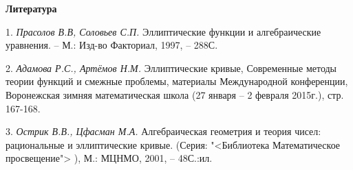 \smallskip \centerline{\bf Литература}\nopagebreak

1. {\it Прасолов В.В, Соловьев С.П. } Эллиптические функции и алгебраические уравнения. -- М.: Изд-во Факториал, 1997, -- 288С.

2. {\it Адамова Р.С., Артёмов Н.М. }Эллиптические кривые, Современные методы теории функций и смежные проблемы, материалы Международной конференции, Воронежская зимняя математическая школа (27 января -- 2 февраля 2015г.), стр. 167-168.

3. {\it Острик В.В., Цфасман М.А.   } Алгебраическая геометрия и теория чисел: рациональные и эллиптические кривые. (Серия: "<Библиотека \glqq Математическое просвещение\grqq "> ), М.: МЦНМО, 2001, -- 48С.:ил.
